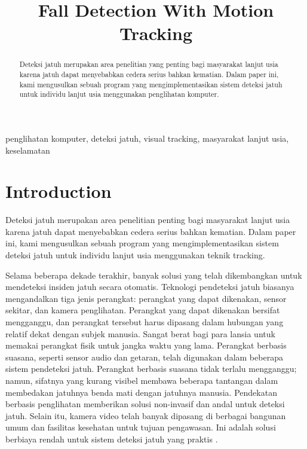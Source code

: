 \documentclass[conference]{IEEEtran}
\begin{document}
\title{Fall Detection With Motion Tracking
}

\author{
}

\maketitle

\begin{abstract}
    Deteksi jatuh merupakan area penelitian yang penting bagi masyarakat
    lanjut usia karena jatuh dapat menyebabkan cedera serius bahkan kematian. Dalam paper ini, kami mengusulkan sebuah program yang mengimplementasikan sistem deteksi jatuh untuk individu lanjut usia menggunakan penglihatan komputer.
\end{abstract}

\begin{IEEEkeywords}
penglihatan komputer, deteksi jatuh, visual tracking, masyarakat lanjut usia, keselamatan
\end{IEEEkeywords}

\section{Introduction}
Deteksi jatuh merupakan area penelitian penting bagi masyarakat lanjut usia karena jatuh dapat menyebabkan cedera serius bahkan kematian. Dalam paper ini, kami mengusulkan sebuah program yang mengimplementasikan sistem deteksi jatuh untuk individu lanjut usia menggunakan teknik tracking.

Selama beberapa dekade terakhir, banyak solusi yang telah dikembangkan untuk mendeteksi insiden jatuh secara otomatis. Teknologi pendeteksi jatuh biasanya mengandalkan tiga jenis perangkat: perangkat yang dapat dikenakan, sensor sekitar, dan kamera penglihatan. Perangkat yang dapat dikenakan bersifat mengganggu, dan perangkat tersebut harus dipasang dalam hubungan yang relatif dekat dengan subjek manusia. Sangat berat bagi para lansia untuk memakai perangkat fisik untuk jangka waktu yang lama. Perangkat berbasis suasana, seperti sensor audio dan getaran, telah digunakan dalam beberapa sistem pendeteksi jatuh. Perangkat berbasis suasana tidak terlalu mengganggu; namun, sifatnya yang kurang visibel membawa beberapa tantangan dalam membedakan jatuhnya benda mati dengan jatuhnya manusia. Pendekatan berbasis penglihatan memberikan solusi non-invasif dan andal untuk deteksi jatuh. Selain itu, kamera video telah banyak dipasang di berbagai bangunan umum dan fasilitas kesehatan untuk tujuan pengawasan. Ini adalah solusi berbiaya rendah untuk sistem deteksi jatuh yang praktis \cite{b1}.
\end{document}
